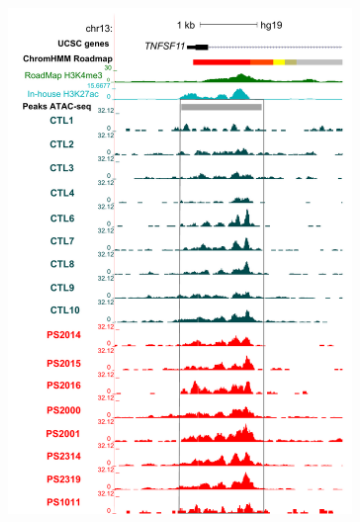 \begin{figure}[htbp]
\centering
\begin{subfigure}{0.6\textwidth}
\centering
\includegraphics[width=\textwidth]{./Results2/pdfs/UCSC_ATAC_CD8_peak_prom_TNFSF11}
\caption{\textbf{}}
\end{subfigure}%
\begin{subfigure}{0.6\textwidth}
\centering

\end{subfigure}
\end{figure}
